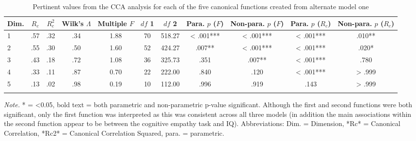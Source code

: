 \documentclass[
  english,
  man,floatsintext]{apa6}
\begin{document}
\begin{table}[tbp]

\begin{center}
\begin{threeparttable}

\caption{\label{tab:alt1_ccatable}Pertinent values from the CCA analysis for each of the five canonical functions 
          created from alternate model one}

\small{

\begin{tabular}{lcccccccccc}
\toprule
Dim. & $R_{c}$ & $R^{2}_{c}$ & Wilk’s $\Lambda$ & Multiple $F$ & $df$ 1 & $df$ 2 & Para. $p$ ($F$) & Non-para. $p$ ($F$) & Para. $p$ ($R_{c}$) & Non-para. $p$ ($R_{c}$)\\
\midrule
1 & .57 & .32 & .34 & 1.88 & 70 & 518.27 & < .001*** & < .001*** & < .001*** & .010**\\
2 & .55 & .30 & .50 & 1.60 & 52 & 424.27 & .007** & < .001*** & < .001*** & .020*\\
3 & .43 & .18 & .72 & 1.08 & 36 & 325.73 & .351 & .007** & < .001*** & .780\\
4 & .33 & .11 & .87 & 0.70 & 22 & 222.00 & .840 & .120 & < .001*** & > .999\\
5 & .13 & .02 & .98 & 0.19 & 10 & 112.00 & .996 & .919 & .143 & > .999\\
\bottomrule
\addlinespace
\end{tabular}

}

\begin{tablenotes}[para]
\normalsize{\textit{Note.} * = <0.05, bold text = both parametric and non-parametric p-value significant. 
          Although the first and second functions were both significant, only the first function was interpreted as this was consistent across all three models (in addition the main associations within 
          the second function appear to be between the cognitive empathy task and IQ). Abbreviations: 
          Dim. = Dimension, *Rc* = Canonical Correlation, *Rc2* = Canonical Correlation Squared, 
          para. = parametric.}
\end{tablenotes}

\end{threeparttable}
\end{center}

\end{table}
\end{document}
